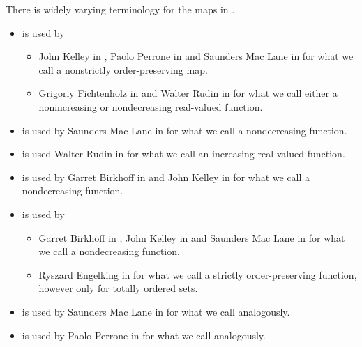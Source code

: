 \begin{remark}\label{rem:order_homomorphism_terminology}
  There is widely varying terminology for the maps in .

  \begin{itemize}
    \item {} is used by
    \begin{itemize}
      \item John Kelley in \cite[3]{Kelley1975}, Paolo Perrone in \cite[exmpl. 1.5.9]{Perrone2019} and Saunders Mac Lane in \cite[92]{MacLane1998} for what we call a nonstrictly order-preserving map.
      \item Grigoriy Fichtenholz in \cite[№47]{ФихтенгольцОсновыТом1} and Walter Rudin in \cite[def. 4.28]{Rudin1976Principles} for what we call either a nonincreasing or nondecreasing real-valued function.
    \end{itemize}

    \item {} is used by Saunders Mac Lane in \cite[175]{MacLane1998} for what we call a nondecreasing function.

    \item {} is used Walter Rudin in \cite[def. 4.28]{Rudin1976Principles} for what we call an increasing real-valued function.

    \item {} is used by Garret Birkhoff in \cite[3]{Birkhoff1948} and John Kelley in \cite[3]{Kelley1975} for what we call a nondecreasing function.

    \item {} is used by
    \begin{itemize}
       \item Garret Birkhoff in \cite[3]{Birkhoff1948}, John Kelley in \cite[3]{Kelley1975} and Saunders Mac Lane in \cite[95]{MacLane1998} for what we call a nondecreasing function.

       \item Ryszard Engelking in \cite[4]{Engelking1989} for what we call a strictly order-preserving function, however only for totally ordered sets.
    \end{itemize}

    \item {} is used by Saunders Mac Lane in \cite[95]{MacLane1998} for what we call analogously.

    \item {} is used by Paolo Perrone in \cite[exmpl. 1.5.9]{Perrone2019} for what we call analogously.


\end{itemize}
\end{remark}

